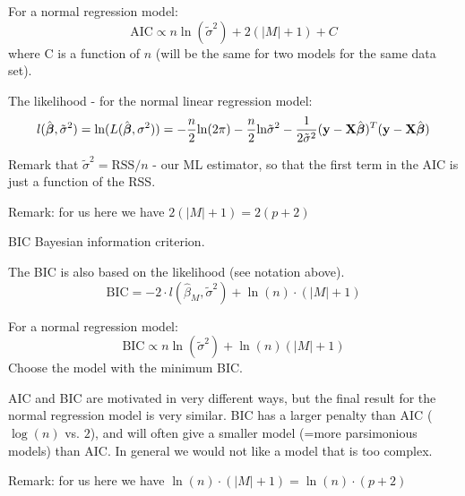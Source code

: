 \documentclass[10pt,ignorenonframetext,]{beamer}
\begin{document}
\begin{frame}

For a normal regression model:
\[\text{AIC} \propto n\ln(\tilde{\sigma}^2)+2(\lvert M\rvert +1)+C\]
where C is a function of \(n\) (will be the same for two models for the
same data set).

The likelihood - for the normal linear regression model:
\[l(\hat{\boldsymbol\beta},{\tilde{\sigma}^2})=\text{ln}(L(\hat{\boldsymbol\beta},{\sigma^2}))=-\frac{n}{2}\text{ln}(2\pi)-\frac{n}{2}\text{ln}\tilde{\sigma}^2-\frac{1}{2\tilde{\sigma}^2} ({\bf y}-{\bf X}\hat{\boldsymbol\beta})^T({\bf y}-
{\bf X}\hat{\boldsymbol\beta})\]

Remark that \(\tilde{\sigma}^2=\text{RSS}/n\) - our ML estimator, so
that the first term in the AIC is just a function of the RSS.

Remark: for us here we have \(2(\lvert M\rvert +1)=2(p+2)\)

\end{frame}

\begin{frame}

\begin{block}{BIC Bayesian information criterion.}

The BIC is also based on the likelihood (see notation above).
\[\text{BIC} =-2 \cdot l(\hat{\beta}_M,\tilde{\sigma}^2)+\ln(n)\cdot (\lvert M\rvert +1)\]

For a normal regression model:
\[ \text{BIC} \propto n\ln(\tilde{\sigma}^2)+\ln(n)(\lvert M\rvert +1)\]
Choose the model with the minimum BIC.

AIC and BIC are motivated in very different ways, but the final result
for the normal regression model is very similar. BIC has a larger
penalty than AIC (\(\log(n)\) vs. \(2\)), and will often give a smaller
model (=more parsimonious models) than AIC. In general we would not like
a model that is too complex.

Remark: for us here we have
\(\ln(n)\cdot (\lvert M\rvert +1)=\ln(n)\cdot (p+2)\)

\end{block}

\end{frame}
\end{document}
